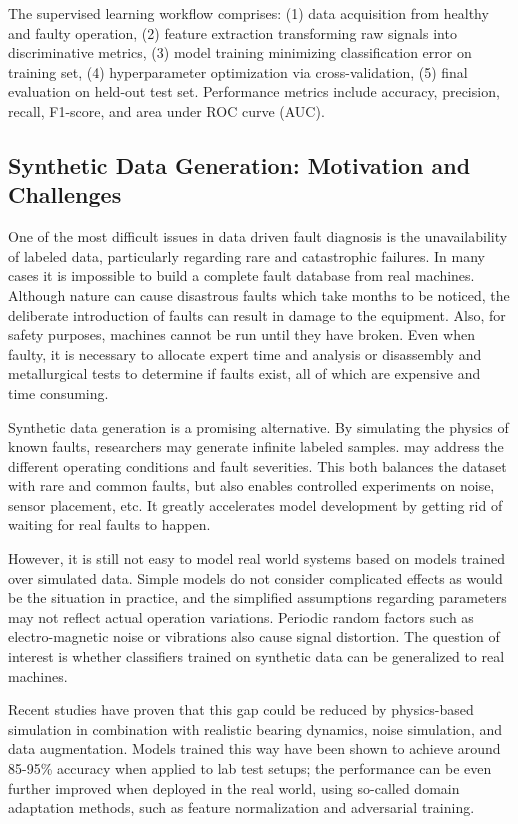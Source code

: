 \documentclass[11pt,a4paper]{article}
\begin{document}
The supervised learning workflow comprises: (1) data acquisition from healthy and faulty operation, (2) feature extraction transforming raw signals into discriminative metrics, (3) model training minimizing classification error on training set, (4) hyperparameter optimization via cross-validation, (5) final evaluation on held-out test set. Performance metrics include accuracy, precision, recall, F1-score, and area under ROC curve (AUC).

\subsection{Synthetic Data Generation: Motivation and Challenges}

One of the most difficult issues in data driven fault diagnosis is the unavailability of labeled data, particularly regarding rare and catastrophic failures. In many cases it is impossible to build a complete fault database from real machines. Although nature can cause disastrous faults which take months to be noticed, the deliberate introduction of faults can result in damage to the equipment. Also, for safety purposes, machines cannot be run until they have broken. Even when faulty, it is necessary to allocate expert time and analysis or disassembly and metallurgical tests to determine if faults exist, all of which are expensive and time consuming.

Synthetic data generation is a promising alternative. By simulating the physics of known faults, researchers may generate infinite labeled samples. may address the different operating conditions and fault severities. This both balances the dataset with rare and common faults, but also enables controlled experiments on noise, sensor placement, etc. It greatly accelerates model development by getting rid of waiting for real faults to happen.

However, it is still not easy to model real world systems based on models trained over simulated data. Simple models do not consider complicated effects as would be the situation in practice, and the simplified assumptions regarding parameters may not reflect actual operation variations. Periodic random factors such as electro-magnetic noise or vibrations also cause signal distortion. The question of interest is whether classifiers trained on synthetic data can be generalized to real machines.

Recent studies have proven that this gap could be reduced by physics-based simulation in combination with realistic bearing dynamics, noise simulation, and data augmentation. Models trained this way have been shown to achieve around 85-95\% accuracy when applied to lab test setups; the performance can be even further improved when deployed in the real world, using so-called domain adaptation methods, such as feature normalization and adversarial training.
\end{document}
